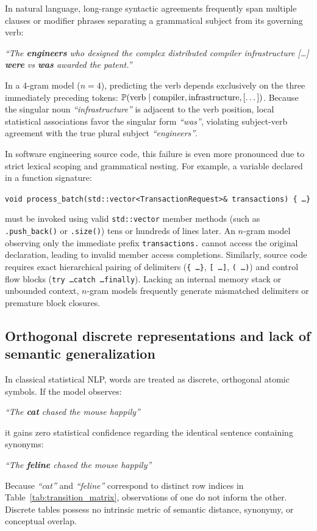 \documentclass[../../main.tex]{subfiles}
\begin{document}
In natural language, long-range syntactic agreements frequently span multiple clauses or modifier phrases separating a grammatical subject from its governing verb:
\begin{center}
\textit{``The \textbf{engineers} who designed the complex distributed compiler infrastructure [\dots] \textbf{were} vs \textbf{was} awarded the patent.''}
\end{center}
In a 4-gram model ($n=4$), predicting the verb depends exclusively on the three immediately preceding tokens: $\mathbb{P}(\text{verb} \mid \text{compiler}, \text{infrastructure}, [\dots])$. Because the singular noun \textit{``infrastructure''} is adjacent to the verb position, local statistical associations favor the singular form \textit{``was''}, violating subject-verb agreement with the true plural subject \textit{``engineers''}.

In software engineering source code, this failure is even more pronounced due to strict lexical scoping and grammatical nesting. For example, a variable declared in a function signature:
\begin{center}
\texttt{void process\_batch(std::vector<TransactionRequest>\& transactions) \{ \dots \}}
\end{center}
must be invoked using valid \texttt{std::vector} member methods (such as \texttt{.push\_back()} or \texttt{.size()}) tens or hundreds of lines later. An $n$-gram model observing only the immediate prefix \texttt{transactions.} cannot access the original declaration, leading to invalid member access completions. Similarly, source code requires exact hierarchical pairing of delimiters (\texttt{\{ \dots \}}, \texttt{[ \dots ]}, \texttt{( \dots )}) and control flow blocks (\texttt{try \dots catch \dots finally}). Lacking an internal memory stack or unbounded context, $n$-gram models frequently generate mismatched delimiters or premature block closures.

\subsection{Orthogonal discrete representations and lack of semantic generalization}
In classical statistical NLP, words are treated as discrete, orthogonal atomic symbols. If the model observes:
\begin{center}
\textit{``The \textbf{cat} chased the mouse happily''}
\end{center}
it gains zero statistical confidence regarding the identical sentence containing synonyms:
\begin{center}
\textit{``The \textbf{feline} chased the mouse happily''}
\end{center}
Because \textit{``cat''} and \textit{``feline''} correspond to distinct row indices in Table~\ref{tab:transition_matrix}, observations of one do not inform the other. Discrete tables possess no intrinsic metric of semantic distance, synonymy, or conceptual overlap.
\end{document}
